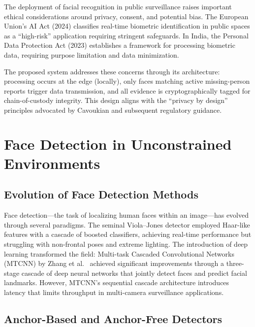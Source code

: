 \documentclass[12pt, a4paper]{article}
\begin{document}
The deployment of facial recognition in public surveillance raises important ethical considerations around privacy, consent, and potential bias. The European Union's AI Act (2024) classifies real-time biometric identification in public spaces as a ``high-risk'' application requiring stringent safeguards. In India, the Personal Data Protection Act (2023) establishes a framework for processing biometric data, requiring purpose limitation and data minimization.

The proposed system addresses these concerns through its architecture: processing occurs at the edge (locally), only faces matching active missing-person reports trigger data transmission, and all evidence is cryptographically tagged for chain-of-custody integrity. This design aligns with the ``privacy by design'' principles advocated by Cavoukian \cite{cavoukian2011} and subsequent regulatory guidance.


\section{Face Detection in Unconstrained Environments}

\subsection{Evolution of Face Detection Methods}

Face detection---the task of localizing human faces within an image---has evolved through several paradigms. The seminal Viola--Jones detector \cite{viola2004} employed Haar-like features with a cascade of boosted classifiers, achieving real-time performance but struggling with non-frontal poses and extreme lighting. The introduction of deep learning transformed the field: Multi-task Cascaded Convolutional Networks (MTCNN) by Zhang et al.\ \cite{zhang2016mtcnn} achieved significant improvements through a three-stage cascade of deep neural networks that jointly detect faces and predict facial landmarks. However, MTCNN's sequential cascade architecture introduces latency that limits throughput in multi-camera surveillance applications.

\subsection{Anchor-Based and Anchor-Free Detectors}
\end{document}

